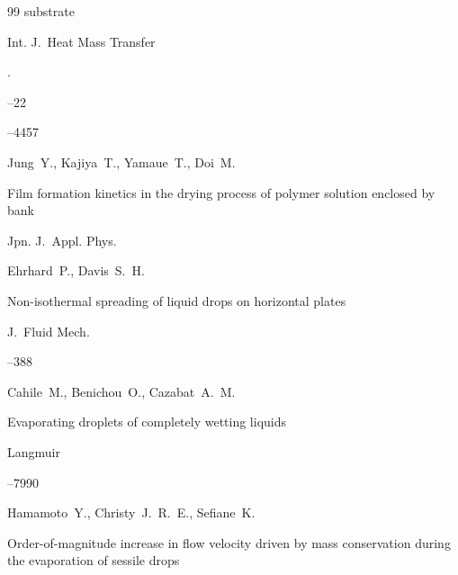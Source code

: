 \begin{thebibliography}{99}
substrate 

\jour Int. J.~Heat Mass Transfer

.


--22

--4457





\by Jung~Y., Kajiya~T., Yamaue~T., Doi~M. 

\paper Film formation kinetics in the drying process of polymer solution enclosed by bank 

\jour Jpn. J.~Appl. Phys. 









\by Ehrhard~P., Davis~S.~H. 

\paper Non-isothermal spreading of liquid drops on horizontal plates 

\jour J.~Fluid Mech. 



--388





\by Cahile~M., Benichou~O., Cazabat~A.~M.

\paper Evaporating droplets of completely wetting liquids 

\jour Langmuir




--7990





\by Hamamoto~Y., Christy~J.~R.~E., Sefiane~K. 

\paper Order-of-magnitude increase in flow velocity driven by mass conservation during the evaporation of sessile drops 


\end{thebibliography}
